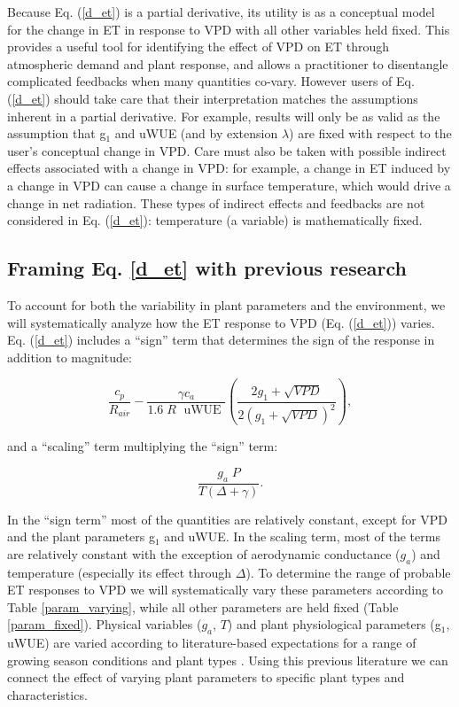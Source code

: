 \documentclass[12pt]{article}
\begin{document}
  Because Eq. (\ref{d_et}) is a partial derivative, its utility is as
  a conceptual model for the change in ET in response to VPD with all
  other variables held fixed. This provides a useful tool for
  identifying the effect of VPD on ET through atmospheric demand and
  plant response, and allows a practitioner to disentangle complicated
  feedbacks when many quantities co-vary. However users of
  Eq. (\ref{d_et}) should take care that their interpretation matches
  the assumptions inherent in a partial derivative. For example,
  results will only be as valid as the assumption that g$_1$ and uWUE
  (and by extension $\lambda$) are fixed with respect to the user's
  conceptual change in VPD. Care must also be taken with possible
  indirect effects associated with a change in VPD: for example, a
  change in ET induced by a change in VPD can cause a change in
  surface temperature, which would drive a change in net
  radiation. These types of indirect effects and feedbacks are not
  considered in Eq. (\ref{d_et}): temperature (a variable) is
  mathematically fixed.

\subsection{Framing Eq. \ref{d_et} with previous research }


  To account for both the variability in plant parameters and the
  environment, we will systematically analyze how the ET response to
  VPD (Eq. (\ref{d_et})) varies. Eq. (\ref{d_et}) includes a
  ``sign'' term that determines the sign of the response in addition
  to magnitude:

\begin{equation}
  \label{sign}
  \frac{c_p}{R_{air}} - \frac{\gamma c_a }{1.6 \; R\; \text{ uWUE }} \left( \frac{2 g_1 + \sqrt{VPD}}{2 (g_1 + \sqrt{VPD})^2}\right),
\end{equation}

and a ``scaling'' term multiplying the ``sign'' term:

\begin{equation}
  \frac{g_a \; P}{T(\Delta + \gamma)}.
\end{equation}

In the ``sign term'' most of the quantities are relatively constant,
except for VPD and the plant parameters g$_1$ and uWUE. In the scaling
term, most of the terms are relatively constant with the exception of
aerodynamic conductance ($g_a$) and temperature (especially its effect
through $\Delta$). To determine the range of probable ET responses to
VPD we will systematically vary these parameters according to Table
\ref{param_varying}, while all other parameters are held fixed (Table
\ref{param_fixed}). Physical variables ($g_a$, $T$) and plant
physiological parameters (g$_1$, uWUE) are varied according to
literature-based expectations for a range of growing season conditions
and plant types \cite{Zhou_2015, Medlyn_2017}. Using this previous
literature we can connect the effect of varying plant parameters to
specific plant types and characteristics.
\end{document}
